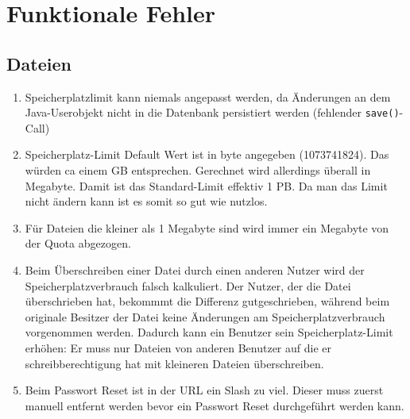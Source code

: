 \documentclass[12pt,DIV14,BCOR10mm,a4paper,parskip=half-,headsepline,headinclude,english,ngerman,bibliography=totocnumbered]{scrreprt}
\begin{document}
\chapter{Funktionale Fehler}


\section{Dateien}

\begin{enumerate}
 \item Speicherplatzlimit kann niemals angepasst werden, da Änderungen an dem Java-Userobjekt nicht in die Datenbank persistiert werden (fehlender \texttt{save()}-Call)
  \item Speicherplatz-Limit Default Wert ist in byte angegeben (1073741824). Das würden ca einem GB entsprechen. Gerechnet wird allerdings überall in Megabyte. Damit ist das Standard-Limit effektiv 1 PB. Da man das Limit nicht ändern kann ist es somit so gut wie nutzlos.
  \item Für Dateien die kleiner als 1 Megabyte sind wird immer ein Megabyte von der Quota abgezogen.
  \item Beim Überschreiben einer Datei durch einen anderen Nutzer wird der Speicherplatzverbrauch falsch kalkuliert. Der Nutzer, der die Datei überschrieben hat, bekommmt die Differenz gutgeschrieben, während beim originale Besitzer der Datei keine Änderungen am Speicherplatzverbrauch vorgenommen werden. Dadurch kann ein Benutzer sein Speicherplatz-Limit erhöhen: Er muss nur Dateien von anderen Benutzer auf die er schreibberechtigung hat mit kleineren Dateien überschreiben.
  \item Beim Passwort Reset ist in der URL ein Slash zu viel. Dieser muss zuerst manuell entfernt werden bevor ein Passwort Reset durchgeführt werden kann.
  

\end{enumerate}
\end{document}
